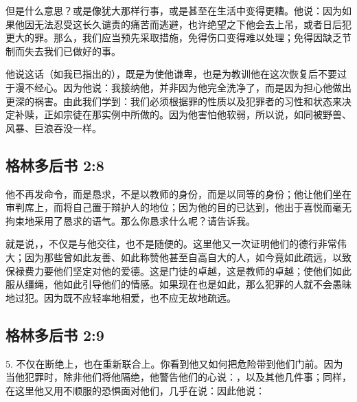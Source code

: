 但是什么意思？或是像犹大那样行事，或是甚至在生活中变得更糟。他说：因为如果他因无法忍受这长久谴责的痛苦而逃避，也许绝望之下他会去上吊，或者日后犯更大的罪。那么，我们应当预先采取措施，免得伤口变得难以处理；免得因缺乏节制而失去我们已做好的事。\par

他说这话（如我已指出的），既是为使他谦卑，也是为教训他在这次恢复后不要过于漫不经心。因为他说：我接纳他，并非因为他完全洗净了，而是因为担心他做出更深的祸害。由此我们学到：我们必须根据罪的性质以及犯罪者的习性和状态来决定补赎，正如宗徒在那实例中所做的。因为他害怕他软弱，所以说，如同被野兽、风暴、巨浪吞没一样。\par


\subsection{格林多后书 2:8}

\par

他不再发命令，而是恳求，不是以教师的身份，而是以同等的身份；他让他们坐在审判席上，而将自己置于辩护人的地位；因为他的目的已达到，他出于喜悦而毫无拘束地采用了恳求的语气。那么你恳求什么呢？请告诉我。\par

\par

就是说，，不仅是与他交往，也不是随便的。这里他又一次证明他们的德行非常伟大；因为那些曾如此友善、如此称赞他甚至自高自大的人，如今竟如此疏远，以致保禄费力要他们坚定对他的爱德。这是门徒的卓越，这是教师的卓越；使他们如此服从缰绳，他如此引导他们的情感。如果现在也是如此，那么犯罪的人就不会愚昧地过犯。因为既不应轻率地相爱，也不应无故地疏远。\par


\subsection{格林多后书 2:9}

5.  不仅在断绝上，也在重新联合上。你看到他又如何把危险带到他们门前。因为当他犯罪时，除非他们将他隔绝，他警告他们的心说：，以及其他几件事；同样，在这里他又用不顺服的恐惧面对他们，几乎在说：因此他说：\par

